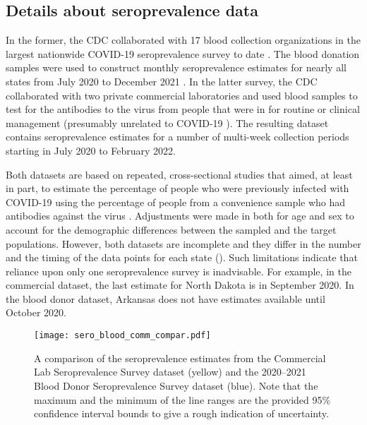 \subsection{Details about seroprevalence data}
\label{supp:sero-details}

In the former, the CDC
collaborated with 17 blood collection organizations in the largest nationwide
COVID-19 seroprevalence survey to date \citep{cdc2021blood}. The blood donation
samples were used to construct monthly seroprevalence estimates for nearly all
states from July 2020 to December 2021 \citep{jones2021estimated}. In the latter
survey, the CDC collaborated with two private commercial laboratories and used
blood samples to test for the antibodies to the virus from people that were in
for routine or clinical management (presumably unrelated to COVID-19
\citealp{bajema2021estimated}). The resulting dataset contains seroprevalence
estimates for a number of multi-week collection periods starting in July 2020 to
February 2022. 

Both datasets are based on repeated, cross-sectional studies that aimed, at
least in part, to estimate the percentage of people who were previously infected
with COVID-19 using the percentage of people from a convenience sample who had
antibodies against the virus \citep{bajema2021estimated, cdc2020data,
jones2021estimated}. Adjustments were made in both for age and sex to account
for the demographic differences between the sampled and the target populations.
However, both datasets are incomplete and they differ in the number and the
timing of the data points for each state ().
Such limitations indicate that reliance upon only one seroprevalence survey is
inadvisable. For example, in the commercial dataset, the last estimate for North
Dakota is in September 2020. In the blood donor dataset, Arkansas does not have
estimates available until October 2020. 

\begin{figure}[!tb]
\centering
    \texttt{[image: sero\_blood\_comm\_compar.pdf]}
    \caption{A comparison of the seroprevalence estimates from the Commercial
    Lab Seroprevalence Survey dataset (yellow) and the 2020--2021 Blood Donor 
    Seroprevalence Survey dataset (blue). Note that the maximum and the minimum
    of the line ranges are the provided 95\% confidence interval bounds to 
    give a rough indication of uncertainty.}
    \label{fig:sero-blood-comm-compar}
\end{figure}
    
